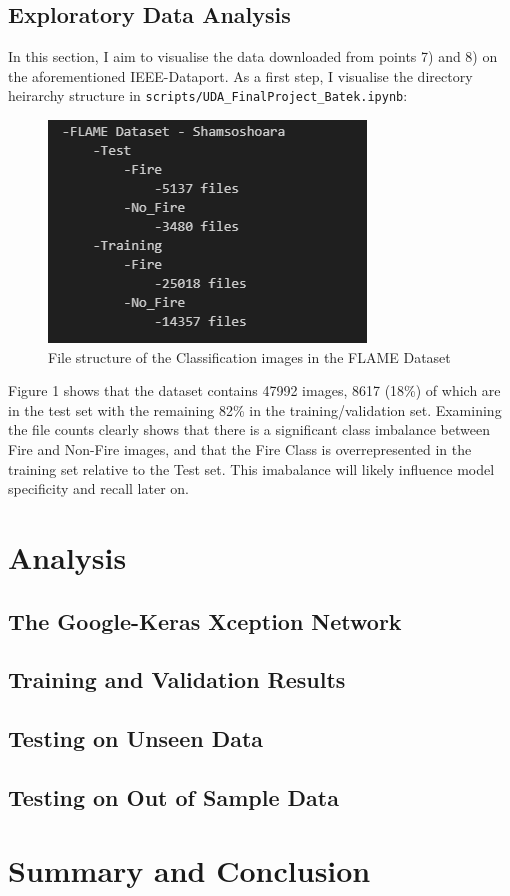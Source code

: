 \documentclass[a4paper,11pt]{article} %
\begin{document}
\subsection{Exploratory Data Analysis}
In this section, I aim to visualise the data downloaded from points 7) and 8) on the aforementioned IEEE-Dataport. As a first step, I visualise the directory
heirarchy structure in \verb!scripts/UDA_FinalProject_Batek.ipynb!:

\begin{figure}[h]
    \includegraphics{../figures/FLAME_dataset_structure.png}
    \caption{File structure of the Classification images in the FLAME Dataset}
\end{figure}

Figure 1 shows that the dataset contains 47992 images, 8617 (18\%) of which are in
the test set with the remaining 82\% in the training\//validation set. Examining the file counts clearly shows that there is a significant class imbalance 
between Fire and Non-Fire images, and that the Fire Class is overrepresented in the training set relative to the Test set. This imabalance will likely
influence model specificity and recall later on.



\section{Analysis}
\blindtext

\subsection{The Google-Keras Xception Network}
\blindtext

\subsection{Training and Validation Results}
\blindtext

\subsection{Testing on Unseen Data}
\blindtext

\subsection{Testing on Out of Sample Data}
\blindtext

\section{Summary and Conclusion}
\blindtext

\printbibliography
\end{document}
